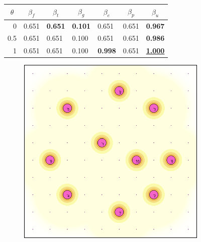 \documentclass[letterpaper, 10 pt, conference]{ieeeconf}
\begin{document}
\begin{figure}[!t]
\begin{minipage}{\columnwidth}
{\begin{tabular}{|lllllll|}
\multicolumn{1}{|c|}{\textbf{$\theta$}} & \multicolumn{1}{c|}{\textbf{$\beta_f$}} & \multicolumn{1}{c|}{\textbf{$\beta_t$}} & \multicolumn{1}{c|}{\textbf{$\beta_g$}} & \multicolumn{1}{c|}{\textbf{$\beta_e$}} & \multicolumn{1}{c|}{\textbf{$\beta_p$}} & \multicolumn{1}{c|}{\textbf{$\beta_u$}} \\ \hline
\multicolumn{1}{|r|}{0} & \multicolumn{1}{l|}{0.651} & \multicolumn{1}{l|}{\textbf{0.651}} & \multicolumn{1}{l|}{\textbf{0.101}} & \multicolumn{1}{l|}{0.651} & \multicolumn{1}{l|}{0.651} & \textbf{0.967} \\ \hline
\multicolumn{1}{|r|}{0.5} & \multicolumn{1}{l|}{0.651} & \multicolumn{1}{l|}{0.651} & \multicolumn{1}{l|}{0.100} & \multicolumn{1}{l|}{0.651} & \multicolumn{1}{l|}{0.651} & \textbf{0.986} \\ \hline
\multicolumn{1}{|r|}{1} & \multicolumn{1}{l|}{0.651} & \multicolumn{1}{l|}{0.651} & \multicolumn{1}{l|}{0.100} & \multicolumn{1}{l|}{\textbf{0.998}} & \multicolumn{1}{l|}{0.651} & {\ul \textbf{1.000}} \\ \hline
\end{tabular}%
}
\vspace{0.5mm}
\end{minipage}
\centering
\begin{subfigure}[t]{0.30\columnwidth}
    \centering
    \includegraphics[width=\columnwidth]{Figures/BlankDecay05.png}

\end{subfigure}
\end{figure}
\end{document}

